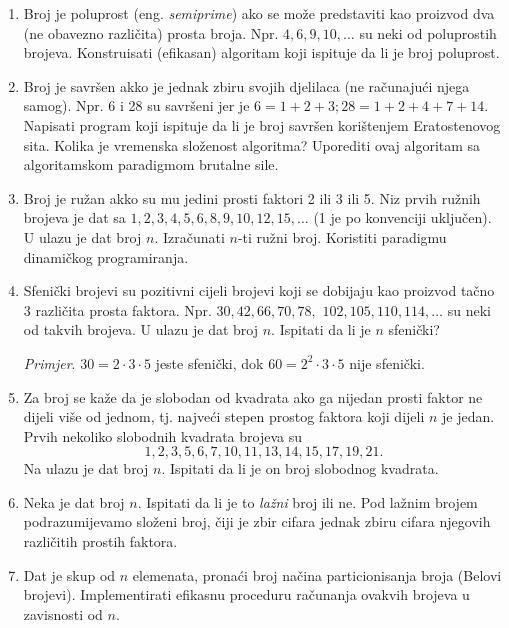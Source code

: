  \begin{enumerate}
 	\item Broj je poluprost (eng. \textit{semiprime}) ako se može predstaviti
 	kao proizvod dva (ne obavezno različita) prosta broja. Npr. $4, 6, 9, 10, \ldots$ su neki od poluprostih brojeva. Konstruisati (efikasan) algoritam koji ispituje da li je broj poluprost.
 	\item Broj je savršen akko je jednak zbiru svojih djelilaca (ne računajući njega samog). Npr. 6 i 28 su savršeni jer je $6 = 1 + 2 + 3; 28 = 1 + 2 + 4 + 7 + 14$. Napisati program koji ispituje da li je broj savršen korištenjem Eratostenovog sita. Kolika je vremenska složenost algoritma? Uporediti ovaj algoritam sa algoritamskom paradigmom brutalne sile.
 	\item Broj je ružan akko su mu jedini prosti faktori 2 ili 3 ili 5. Niz prvih ružnih brojeva je dat sa $1, 2, 3, 4, 5, 6, 8, 9, 10, 12, 15, \ldots$ (1 je po
 	konvenciji uključen). U ulazu je  dat broj $n$. Izračunati $n$-ti ružni broj. Koristiti paradigmu dinamičkog programiranja.
 	\item Sfenički brojevi su pozitivni cijeli brojevi koji se dobijaju kao proizvod tačno 3 različita prosta faktora. Npr. $30, 42, 66, 70, 78,$ $102, 105, 110, 114, \ldots$ su neki od takvih brojeva. U ulazu je dat broj $n$. Ispitati da li je $n$ sfenički? 
 	
 	\textit{Primjer}. $30=2 \cdot 3 \cdot 5$ jeste sfenički, dok $60 = 2^2 \cdot 3 \cdot 5 $ nije sfenički. 
 	\item Za broj se kaže da je slobodan od kvadrata ako ga nijedan
 	prosti faktor ne dijeli više od jednom, tj. najveći stepen prostog
 	faktora koji dijeli $n$  je jedan.  Prvih nekoliko slobodnih kvadrata brojeva su $$1, 2, 3, 5, 6, 7,
 	10, 11, 13, 14, 15, 17, 19, 21.$$   Na ulazu je dat broj $n$. Ispitati da li je on broj 	slobodnog kvadrata.
 	\item Neka je dat broj $n$. Ispitati da li je to \textit{lažni} broj ili ne.
 	Pod lažnim brojem podrazumijevamo složeni broj, čiji je zbir cifara jednak zbiru cifara njegovih različitih prostih faktora.%
 	
 	\item Dat je skup od $n$ elemenata, pronaći broj načina particionisanja broja (Belovi brojevi). Implementirati efikasnu proceduru računanja ovakvih brojeva u zavisnosti od $n$.  %
 \end{enumerate}